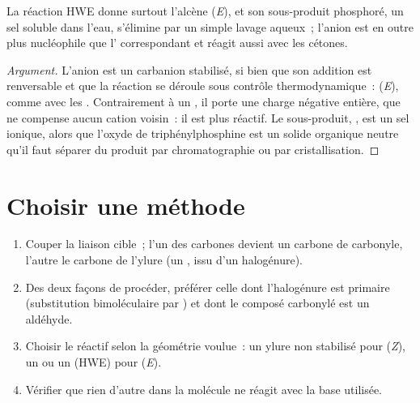 \begin{proposition}\label{prop:b2:wittig:hwe}
La réaction HWE donne surtout l'alcène (\textit{E}), et son sous-produit phosphoré, un sel soluble dans
l'eau, s'élimine par un simple lavage aqueux~; l'anion  est en outre plus nucléophile que
l' correspondant et réagit aussi avec les cétones.
\end{proposition}

\begin{proof}[Argument]
L'anion  est un carbanion stabilisé, si bien que son addition est renversable et que la
réaction se déroule sous contrôle thermodynamique~: (\textit{E}), comme avec les .
Contrairement à un , il porte une charge négative entière, que ne compense aucun
cation voisin~: il est plus réactif. Le sous-produit, , est un sel ionique, alors que
l'oxyde de triphénylphosphine est un solide organique neutre qu'il faut séparer du produit par
chromatographie ou par cristallisation.
\end{proof}

\section{Choisir une méthode}

\begin{method}\label{met:b2:wittig:wittig-disconnection}
\begin{enumerate}
  \item Couper la liaison  cible~; l'un des carbones devient un carbone de carbonyle, l'autre le
        carbone de l'ylure (un , issu d'un halogénure).
  \item Des deux façons de procéder, préférer celle dont l'halogénure est primaire (substitution
        bimoléculaire par ) et dont le composé carbonylé est un aldéhyde.
  \item Choisir le réactif selon la géométrie voulue~: un ylure non stabilisé pour (\textit{Z}), un
         ou un  (HWE) pour (\textit{E}).
  \item Vérifier que rien d'autre dans la molécule ne réagit avec la base utilisée.
\end{enumerate}
\end{method}

